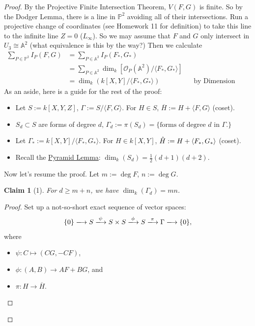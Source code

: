 \documentclass[12pt]{article}
\newcommand{\vbrack}[1]{\langle #1\rangle}
\newtheorem*{claim}{Claim}
\theoremstyle{definition}
\begin{document}
\begin{proof}
    By the Projective Finite Intersection Theorem, $V(F,G)$ is finite. So by the Dodger Lemma, there is a line in $\mathbb{P}^2$ avoiding all of their intersections. Run a projective change of coordinates (see Homework 11 for definition) to take this line to the infinite line $Z=0$ ($L_{\infty}$). So we may assume that $F$ and $G$ only intersect in $U_3\cong\mathbb{A}^2$ (what equivalence is this by the way?) Then we calculate
    \begin{align*}
        \sum\limits_{P\in\mathbb{P}^2}I_P(F,G)&=\sum\limits_{P\in\mathbb{A}^2}I_P(F_*,G_*)\\
        &=\sum\limits_{P\in\mathbb{A}^2}\dim_k[\mathcal{O}_P(\mathbb{A}^2)/\vbrack{F_*,G_*}]\\
        &=\dim_k(k[X,Y]/\vbrack{F_*,G_*})&&\text{by Dimension Theorem.}
    \end{align*}
    As an aside, here is a guide for the rest of the proof:
    \begin{itemize}
        \item Let $S:=k[X,Y,Z]$, $\Gamma:=S/\vbrack{F,G}$. For $H\in S$, $\overline{H}:=H+\vbrack{F,G}$ (coset).
        \item $S_d\subset S$ are forms of degree $d$, $\Gamma_d:=\pi(S_d)=\{\text{forms of degree }d\text{ in }\Gamma.\}$
        \item Let $\Gamma_*:=k[X,Y]/\vbrack{F_*,G_*}$. For $H\in k[X,Y]$, $\Hat{H}:=H+\vbrack{F_*,G_*}$ (coset).
        \item Recall the \underline{Pyramid Lemma}: $\dim_k(S_d)=\frac{1}{2}(d+1)(d+2)$.
    \end{itemize}
    Now let's resume the proof. Let $m:=\deg F$, $n:=\deg G$.
    \begin{claim}[1]
        For $d\geq m+n$, we have $\dim_k(\Gamma_d)=mn$.
    \end{claim}
    \begin{proof}
        Set up a not-so-short exact sequence of vector spaces:
        \begin{equation}
            \{0\}\xlongrightarrow{} S\xlongrightarrow{\psi}S\times S\xlongrightarrow{\phi}S\xlongrightarrow{\pi}\Gamma\xlongrightarrow{}\{0\},
        \end{equation}
        where
        \begin{itemize}
            \item $\psi:C\mapsto(CG,-CF)$,
            \item $\phi:(A,B)\to AF+BG$, and
            \item $\pi:H\to\overline{H}$.

\end{itemize}
\end{proof}
\end{proof}
\end{document}
